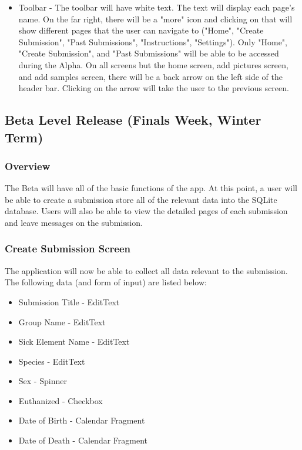 \documentclass[onecolumn, draftclsnofoot, article, 10pt, compsoc]{IEEEtran}
\begin{document}
\begin{itemize}
\item Toolbar - The toolbar will have white text. The text will display each page's name. On the far right, there will be a "more" icon and clicking on that will show different pages that the user can navigate to ("Home", "Create Submission", "Past Submissions", "Instructions", "Settings"). Only "Home", "Create Submission", and "Past Submissions" will be able to be accessed during the Alpha. On all screens but the home screen, add pictures screen, and add samples screen, there will be a back arrow on the left side of the header bar. Clicking on the arrow will take the user to the previous screen.




\end{itemize}

\subsection{Beta Level Release (Finals Week, Winter Term)}
\subsubsection{Overview}
The Beta will have all of the basic functions of the app. At this point, a user will be able to create a submission store all of the relevant data into the SQLite database. Users will also be able to view the detailed pages of each submission and leave messages on the submission. 

\subsubsection{Create Submission Screen}
The application will now be able to collect all data relevant to the submission. The following data (and form of input) are listed below:
\begin{itemize}
    \item Submission Title - EditText
    \item Group Name - EditText
    \item Sick Element Name - EditText
    \item Species - EditText
    \item Sex - Spinner
    \item Euthanized - Checkbox
    \item Date of Birth - Calendar Fragment
    \item Date of Death - Calendar Fragment
    
\end{itemize}
\end{document}
